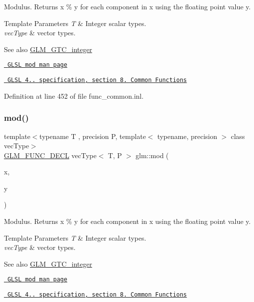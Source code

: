Modulus. Returns x \% y for each component in x using the floating point value y.


\begin{DoxyTemplParams}{Template Parameters}
{\em T} & Integer scalar types. \\
\hline
{\em vec\+Type} & vector types.\\
\hline
\end{DoxyTemplParams}
\begin{DoxySeeAlso}{See also}
\mbox{\hyperlink{group__gtc__integer}{G\+L\+M\+\_\+\+G\+T\+C\+\_\+integer}} 

\href{http://www.opengl.org/sdk/docs/manglsl/xhtml/mod.xml}{\texttt{ G\+L\+SL mod man page}} 

\href{http://www.opengl.org/registry/doc/GLSLangSpec.4.20.8.pdf}{\texttt{ G\+L\+SL 4.. specification, section 8. Common Functions}} 
\end{DoxySeeAlso}


Definition at line 452 of file func\+\_\+common.\+inl.

\mbox{\label{group__gtc__integer_ga689e2d9100af0bfc4d9954c96221095e}} 
\subsubsection{\texorpdfstring{mod()}{mod()}\hspace{0.1cm}{\footnotesize\ttfamily [3/3]}}
{\footnotesize\ttfamily template$<$typename T , precision P, template$<$ typename, precision $>$ class vec\+Type$>$ \\
\mbox{\hyperlink{setup_8hpp_ab2d052de21a70539923e9bcbf6e83a51}{G\+L\+M\+\_\+\+F\+U\+N\+C\+\_\+\+D\+E\+CL}} vec\+Type$<$ T, P $>$ glm\+::mod (\begin{DoxyParamCaption}\item[{vec\+Type$<$ T, P $>$ const \&}]{x,  }\item[{vec\+Type$<$ T, P $>$ const \&}]{y }\end{DoxyParamCaption})}

Modulus. Returns x \% y for each component in x using the floating point value y.


\begin{DoxyTemplParams}{Template Parameters}
{\em T} & Integer scalar types. \\
\hline
{\em vec\+Type} & vector types.\\
\hline
\end{DoxyTemplParams}
\begin{DoxySeeAlso}{See also}
\mbox{\hyperlink{group__gtc__integer}{G\+L\+M\+\_\+\+G\+T\+C\+\_\+integer}} 

\href{http://www.opengl.org/sdk/docs/manglsl/xhtml/mod.xml}{\texttt{ G\+L\+SL mod man page}} 

\href{http://www.opengl.org/registry/doc/GLSLangSpec.4.20.8.pdf}{\texttt{ G\+L\+SL 4.. specification, section 8. Common Functions}} 
\end{DoxySeeAlso}


